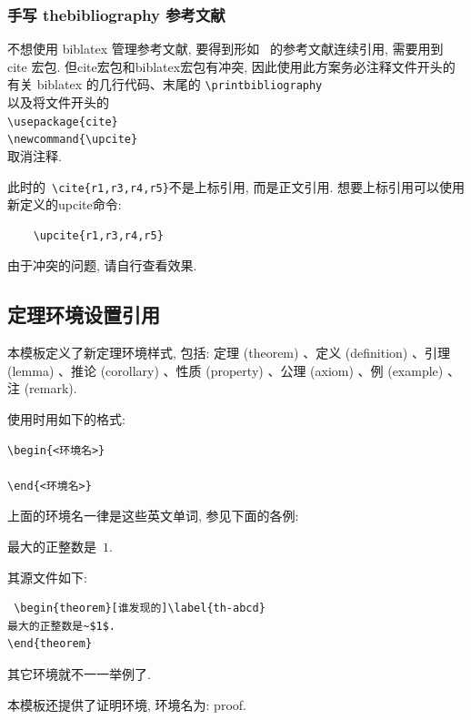 \subsubsection{手写 thebibliography 参考文献}
不想使用 biblatex 管理参考文献, 要得到形如~{\cite{r1,r3,r4,r5}} 的参考文献连续引用, 需要用到 cite 宏包. 但cite宏包和biblatex宏包有冲突, 因此使用此方案务必注释文件开头的有关 biblatex 的几行代码、末尾的
\verb|\printbibliography|\\
以及将文件开头的\\
\verb|\usepackage{cite}|\\
\verb|\newcommand{\upcite}|\\
取消注释.

此时的~\verb|\cite{r1,r3,r4,r5}|不是上标引用, 而是正文引用. 想要上标引用可以使用新定义的upcite命令:
\begin{lstlisting}
    \upcite{r1,r3,r4,r5}
\end{lstlisting}
由于冲突的问题, 请自行查看效果.

\subsection{定理环境设置引用}

本模板定义了新定理环境样式, 包括: 定理 (theorem) 、定义 (definition) 、引理 (lemma) 、推论 (corollary) 、性质 (property) 、公理 (axiom) 、例 (example) 、注 (remark).

使用时用如下的格式:
\begin{lstlisting}
\begin{<环境名>}

\end{<环境名>}
\end{lstlisting}

上面的环境名一律是这些英文单词, 参见下面的各例:

\begin{theorem}[谁发现的]\label{th-abcd}
    最大的正整数是~$1$.
\end{theorem}

其源文件如下:

\begin{lstlisting}
 \begin{theorem}[谁发现的]\label{th-abcd}
最大的正整数是~$1$.
\end{theorem}
\end{lstlisting}

其它环境就不一一举例了.

本模板还提供了证明环境, 环境名为: proof.


